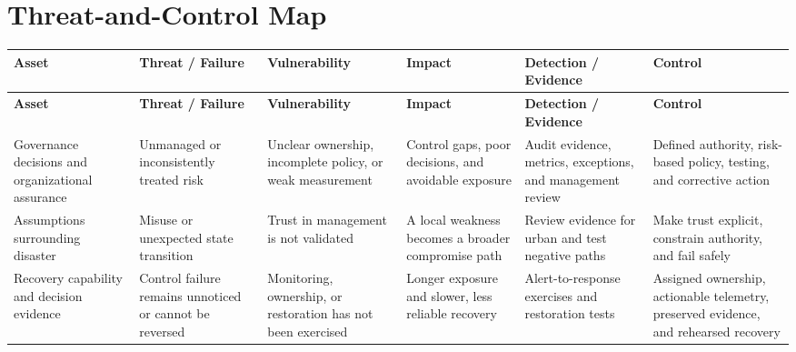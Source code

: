 \documentclass[11pt]{article}
\begin{document}
\section*{Threat-and-Control Map}
\begingroup\scriptsize\setlength{\tabcolsep}{2pt}
\begin{longtable}{>{\RaggedRight\arraybackslash}p{}>{\RaggedRight\arraybackslash}p{}>{\RaggedRight\arraybackslash}p{}>{\RaggedRight\arraybackslash}p{}>{\RaggedRight\arraybackslash}p{}>{\RaggedRight\arraybackslash}p{}}
\toprule\rowcolor{Navy}\color{white}\textbf{Asset} & \color{white}\textbf{Threat / Failure} & \color{white}\textbf{Vulnerability} & \color{white}\textbf{Impact} & \color{white}\textbf{Detection / Evidence} & \color{white}\textbf{Control}\\\midrule
\endfirsthead
\toprule\rowcolor{Navy}\color{white}\textbf{Asset} & \color{white}\textbf{Threat / Failure} & \color{white}\textbf{Vulnerability} & \color{white}\textbf{Impact} & \color{white}\textbf{Detection / Evidence} & \color{white}\textbf{Control}\\\midrule
\endhead
Governance decisions and organizational assurance & Unmanaged or inconsistently treated risk & Unclear ownership, incomplete policy, or weak measurement & Control gaps, poor decisions, and avoidable exposure & Audit evidence, metrics, exceptions, and management review & Defined authority, risk-based policy, testing, and corrective action\\\midrule
Assumptions surrounding disaster & Misuse or unexpected state transition & Trust in management is not validated & A local weakness becomes a broader compromise path & Review evidence for urban and test negative paths & Make trust explicit, constrain authority, and fail safely\\\midrule
Recovery capability and decision evidence & Control failure remains unnoticed or cannot be reversed & Monitoring, ownership, or restoration has not been exercised & Longer exposure and slower, less reliable recovery & Alert-to-response exercises and restoration tests & Assigned ownership, actionable telemetry, preserved evidence, and rehearsed recovery\\\midrule
\bottomrule
\end{longtable}
\endgroup
\end{document}
